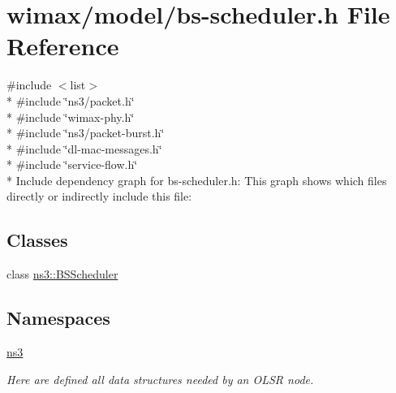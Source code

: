 \hypertarget{bs-scheduler_8h}{}\section{wimax/model/bs-\/scheduler.h File Reference}
\label{bs-scheduler_8h}
{\ttfamily \#include $<$list$>$}\\*
{\ttfamily \#include \char`\"{}ns3/packet.\+h\char`\"{}}\\*
{\ttfamily \#include \char`\"{}wimax-\/phy.\+h\char`\"{}}\\*
{\ttfamily \#include \char`\"{}ns3/packet-\/burst.\+h\char`\"{}}\\*
{\ttfamily \#include \char`\"{}dl-\/mac-\/messages.\+h\char`\"{}}\\*
{\ttfamily \#include \char`\"{}service-\/flow.\+h\char`\"{}}\\*
Include dependency graph for bs-\/scheduler.h\+:
This graph shows which files directly or indirectly include this file\+:
\subsection*{Classes}
\begin{DoxyCompactItemize}
\item 
class \hyperlink{classns3_1_1BSScheduler}{ns3\+::\+B\+S\+Scheduler}
\end{DoxyCompactItemize}
\subsection*{Namespaces}
\begin{DoxyCompactItemize}
\item 
 \hyperlink{namespacens3}{ns3}
\begin{DoxyCompactList}\small\item\em Here are defined all data structures needed by an O\+L\+SR node. \end{DoxyCompactList}\end{DoxyCompactItemize}
